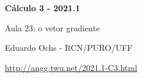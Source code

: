 \documentclass[oneside,12pt]{article}
\begin{document}


%
%

\def\drafturl{http://angg.twu.net/LATEX/2021-1-C3.pdf}
\def\drafturl{http://angg.twu.net/2021.1-C3.html}
\def\draftfooter{\tiny \href{\drafturl}{\jobname{}} \ColorBrown{\shorttoday{} \hours}}



%

\thispagestyle{empty}

\begin{center}

\vspace*{1.2cm}

{\bf \Large Cálculo 3 - 2021.1}

\bsk

Aula 23: o vetor gradiente

\bsk

Eduardo Ochs - RCN/PURO/UFF

\url{http://angg.twu.net/2021.1-C3.html}

\end{center}

\newpage
\end{document}
